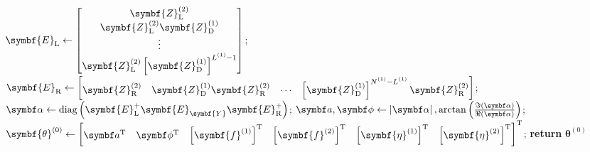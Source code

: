 \begin{algorithm}[h!]
\begin{algorithmic}[1]
       \State $
            \symbf{E}_{\text{L}} \gets
            \begin{bmatrix}
                \symbf{Z}^{(2)}_{\text{L}} \\
                \symbf{Z}^{(2)}_{\text{L}} \symbf{Z}^{(1)}_{\text{D}} \\
                \vdots\\
                \symbf{Z}^{(2)}_{\text{L}} \left[\symbf{Z}^{(1)}_{\text{D}}\right]^{\Lone - 1}
            \end{bmatrix}
        $;
        \State $
            \symbf{E}_{\text{R}} \gets
            \begin{bmatrix}
                \symbf{Z}^{(2)}_{\text{R}} &
                \symbf{Z}^{(1)}_{\text{D}} \symbf{Z}^{(2)}_{\text{R}} &
                \cdots &
                \left[\symbf{Z}^{(1)}_{\text{D}}\right]^{\None - \Lone} \symbf{Z}^{(2)}_{\text{R}}
            \end{bmatrix}
        $;
        \State $
           \bdalpha \gets \diag
           \left(
               \symbf{E}_{\text{L}}^+
               \symbf{E}_{\symbf{Y}}^{\vphantom{+}}
               \symbf{E}_{\text{R}}^+
           \right)
           $;
        \State $
            \bda, \bdphi \gets
            \left\lvert \bdalpha \right\rvert,
            \arctan \left( \frac{\Im\left(\bdalpha\right)}{\Re\left(\bdalpha\right)} \right)
        $;
        \State $\symbf{\theta}^{(0)} \gets
        \begin{bmatrix}
            \bda\T &
            \bdphi\T &
            \left[\symbf{f}^{(1)}\right]\T &
            \left[\symbf{f}^{(2)}\right]\T &
            \left[\symbf{\eta}^{(1)}\right]\T &
            \left[\symbf{\eta}^{(2)}\right]\T
        \end{bmatrix}
        ^{\mathrm{T}}$;
        \State \textbf{return} $\symbf{\theta}^{(0)}$
    \EndProcedure
    \end{algorithmic}
\end{algorithm}
\vfill\null



